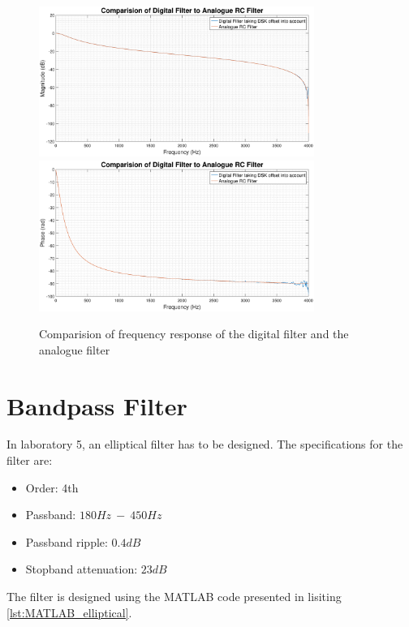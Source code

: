 \documentclass{article}
\begin{document}
\begin{figure}[H]
    \centering
    \includegraphics[width=0.80\textwidth]{mag_response_comparison}
    \includegraphics[width=0.80\textwidth]{phase_response_comparison}
    \caption{Comparision of frequency response of the digital filter and the analogue filter}
    \label{fig:RC_comparison}
\end{figure}

\newpage
\section{Bandpass Filter}\label{sec:bandpass_design}
In laboratory 5, an elliptical filter has to be designed. The specifications for the filter are:
\begin{itemize}
    \item Order: 4th
    \item Passband: $180Hz \ - \ 450Hz$
    \item Passband ripple: $0.4dB$
    \item Stopband attenuation: $23dB$ 
\end{itemize}

The filter is designed using the MATLAB code presented in lisiting \ref{lst:MATLAB_elliptical}.
\end{document}
